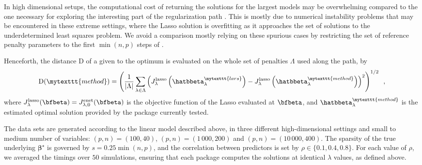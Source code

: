   In high dimensional setups, the computational cost of returning the solutions
  for the largest models may be overwhelming compared to the one necessary
  for exploring the interesting part of the regularization path
  \citep{2011_JSS_Simon,2009_JSS_Friedman}.  This is mostly due to numerical
  instability problems that may be encountered in these extreme settings, where
  the Lasso solution is overfitting as it approaches the set of solutions to the
  underdetermined least squares problem.  We avoid a
  comparison mostly relying on these spurious cases by restricting the set
  of reference penalty parameters to the first $\min(n,p)$ steps of
   \citep[similar settings are used by][]{2009_JSS_Friedman}.

  Henceforth, the  distance $\mathrm{D}$  of a given   to
  the optimum is evaluated on  the whole set of penalties $\Lambda$ used
  along the path, by
  \begin{equation*}
    \mathrm{D}(\mytexttt{method}) = \left( \frac{1}{|\Lambda|}\sum_{\lambda\in\Lambda}
      \left(J_{\lambda}^{\text{lasso}}\left(\hatbbeta_\lambda^{\mytexttt{lars}}\right)
        -J_{\lambda}^{\text{lasso}}\left(\hatbbeta_\lambda^{\mytexttt{method}}\right)\right)^2
       \right)^{1/2} 
    \enspace,
  \end{equation*}
  where $J_{\lambda}^{\text{lasso}}(\bfbeta) = J_{\lambda,0}^{\text{enet}}(\bfbeta)$ 
  is the objective function of the Lasso evaluated at $\bfbeta$, and
  $\hatbbeta_\lambda^{\mytexttt{method}}$ is the estimated optimal solution
  provided by the  package currently tested.
\fi

The data  sets are  generated according to  the linear  model described
above, in three different high-dimensional settings and small to medium number 
of variables: 
$(p,n)=(100,40)$, $(p,n)=(1\,000,200)$ and $(p,n)=(10\,000,400)$.  
The sparsity of the true underlying $\boldsymbol\beta^\star$ is governed by $s =
0.25\min(n,p)$, and the correlation between predictors is set by $\rho\in\{0.1, 0.4,  0.8\}$. For  each  value of
$\rho$, we averaged the timings over $50$ simulations, ensuring that each package
computes the solutions at identical $\lambda$ values, as defined above.

\iflong

